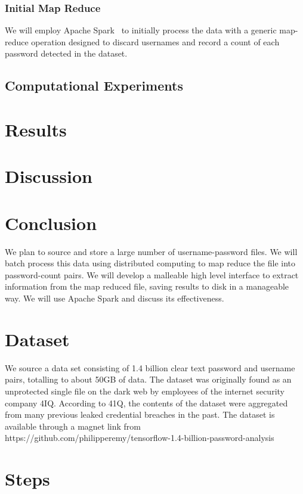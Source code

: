 \documentclass{article}
\begin{document}
\begin{multicols}{2}
\subsubsection*{Initial Map Reduce}
We will employ Apache Spark~\cite{apache-spark} to initially process the data with a generic map-reduce operation designed to discard usernames and record a count of each password detected in the dataset.

\subsection*{Computational Experiments}

\section*{ Results}

\section*{ Discussion}
\cite{kelley2012guess} \cite{weir2009password}

\section*{ Conclusion}

{\color{red}

We plan to source and store a large number of username-password files. We will batch process this data using distributed computing to map reduce the file into password-count pairs. We will develop a malleable high level interface to extract information from the map reduced file, saving results to disk in a manageable way.  We will use Apache Spark and discuss its effectiveness.

\section*{Dataset}
We source a data set consisting of 1.4 billion clear text password and username pairs, totalling to about 50GB of data. The dataset was originally found as an unprotected single file on the dark web by employees of the internet security company 4IQ. According to 41Q, the contents of the dataset were aggregated from many previous leaked credential breaches in the past. The dataset is available through a magnet link from https://github.com/philipperemy/tensorflow-1.4-billion-password-analysis

\section*{Steps}

}
\end{multicols}
\end{document}
